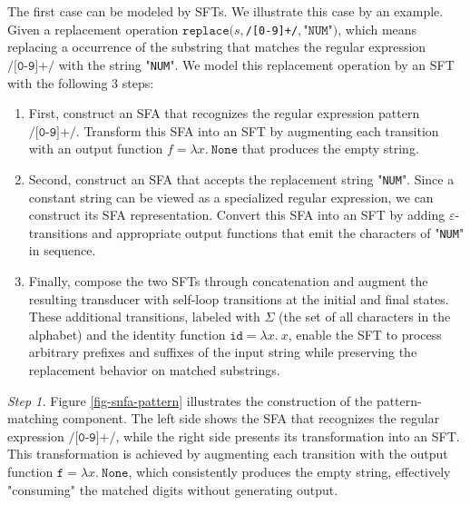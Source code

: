 \documentclass[a4paper,UKenglish,cleveref, autoref, thm-restate]{lipics-v2021}
\begin{document}
The first case can be modeled by SFTs. We illustrate this case by an example. Given a replacement operation $\texttt{replace}(s, $\texttt{/[0-9]+/}$, $"$\texttt{NUM}$"$)$, which means replacing a occurrence of the substring that matches the regular expression $\texttt{/[0-9]+/}$ with the string "\texttt{NUM}".
We model this replacement operation by an SFT with the following 3 steps:

\begin{enumerate}
  \item First, construct an SFA that recognizes the regular expression pattern $\texttt{/[0-9]+/}$. Transform this SFA into an SFT by augmenting each transition with an output function $f = \lambda x.~\texttt{None}$ that produces the empty string. 
  \item Second, construct an SFA that accepts the replacement string "\texttt{NUM}". Since a constant string can be viewed as a specialized regular expression, we can construct its SFA representation. Convert this SFA into an SFT by adding $\varepsilon$-transitions  and appropriate output functions that emit the characters of "\texttt{NUM}" in sequence.
  \item Finally, compose the two SFTs through concatenation and augment the resulting transducer with self-loop transitions at the initial and final states. These additional transitions, labeled with $\Sigma$ (the set of all characters in the alphabet) and the identity function $\texttt{id}=\lambda x.~x$, enable the SFT to process arbitrary prefixes and suffixes of the input string while preserving the replacement behavior on matched substrings.
\end{enumerate}


\noindent\emph{Step 1.}
Figure \ref{fig-snfa-pattern} illustrates the construction of the pattern-matching component. The left side shows the SFA that recognizes the regular expression $\texttt{/[0-9]+/}$, while the right side presents its transformation into an SFT. This transformation is achieved by augmenting each transition with the output function $\texttt{f} = \lambda x.~\texttt{None}$, which consistently produces the empty string, effectively "consuming" the matched digits without generating output.
\end{document}
